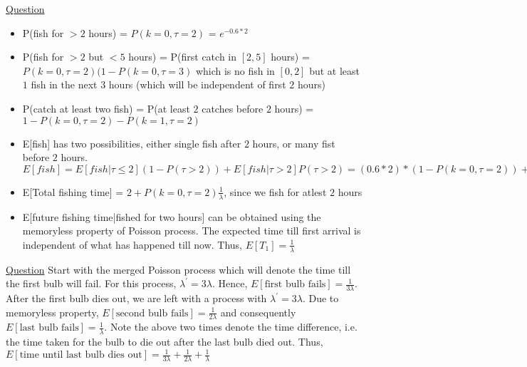 \documentclass[11pt, a4paper]{article}
\begin{document}
\begin{enumerate}
        \hypertarget{a_poissonfish}{\item} \hyperlink{q_poissonfish}{Question}
        \begin{itemize}
            \item P(fish for $> 2$ hours) = $P(k=0, \tau=2)$ = $e^{-0.6 * 2}$
            \item P(fish for $> 2$ but $< 5$ hours) = P(first catch in $[2,5]$ hours) = $P(k=0,\tau=2)(1-P(k=0,\tau=3)$ which is no fish in $[0,2]$ but at least $1$ fish in the next $3$ hours (which will be independent of first $2$ hours)
            \item P(catch at least two fish) = P(at least $2$ catches before $2$ hours) = $1 - P(k=0,\tau=2) - P(k=1,\tau=2)$
            \item E[fish] has two possibilities, either single fish after $2$ hours, or many fist before $2$ hours. $E[fish] = E[fish|\tau \leq 2](1-P(\tau > 2)) + E[fish|\tau > 2] P(\tau > 2) = (0.6*2)*(1-P(k=0,\tau=2)) + 1*P(k=0,\tau=2)$
            \item E[Total fishing time] = $2 + P(k=0,\tau=2)\frac{1}{\lambda}$, since we fish for atlest $2$ hours
            \item E[future fishing time|fished for two hours] can be obtained using the memoryless property of Poisson process. The expected time till first arrival is independent of what has happened till now. Thus, $E[T_{1}] = \frac{1}{\lambda}$
        \end{itemize}

        \hypertarget{a_poissonbulb}{\item} \hyperlink{q_poissonbulb}{Question}\newline
        Start with the merged Poisson process which will denote the time till the first bulb will fail. For this process, $\lambda^{'} = 3\lambda$. Hence, $E[\text{first bulb fails}] = \frac{1}{3\lambda}$.
        After the first bulb dies out, we are left with a process with $\lambda^{'} = 3\lambda$. Due to memoryless property, $E[\text{second bulb fails}] = \frac{1}{2\lambda}$ and consequently $E[\text{last bulb fails}] = \frac{1}{\lambda}$. \newline
        Note the above two times denote the time difference, i.e. the time taken for the bulb to die out after the last bulb died out. Thus, $E[\text{time until last bulb dies out}] = \frac{1}{3\lambda} + \frac{1}{2\lambda} + \frac{1}{\lambda}$


\end{enumerate}
\end{document}
